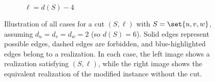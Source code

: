 {\begin{figure}[!ht]
\begin{subfigure}[b]{0.49\textwidth}
\caption{$\ell = d(S) - 4$}
\label{fig:proof_w=3_l=dS-4}
\end{subfigure}

\caption{
    Illustration of all cases for a cut $(S, \ell)$ with $S = \set{u, v, w}$, assuming $d_u = d_v = d_w = 2$ (so $d(S) = 6$). Solid edges represent possible edges, dashed edges are forbidden, and blue-highlighted edges belong to a realization. In each case, the left image shows a realization satisfying $(S, \ell)$, while the right image shows the equivalent realization of the modified instance without the cut.
}

\end{figure}
}